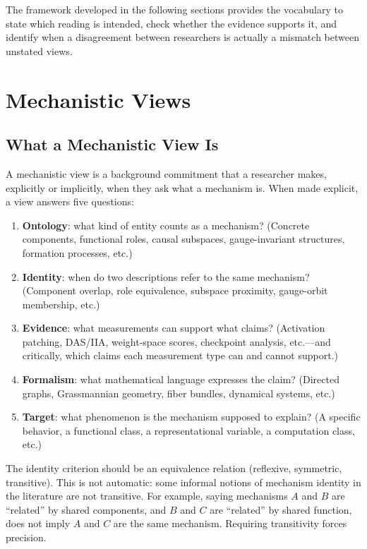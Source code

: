 \documentclass{article}
\begin{document}
The framework developed in the following sections provides the
vocabulary to state which reading is intended, check whether the
evidence supports it, and identify when a disagreement between
researchers is actually a mismatch between unstated views.


\section{Mechanistic Views}\label{sec:views}

\subsection{What a Mechanistic View Is}

A mechanistic view is a background commitment that a researcher makes,
explicitly or implicitly, when they ask what a mechanism is.  When made
explicit, a view answers five questions:

\begin{enumerate}[leftmargin=*, label=(\roman*)]
\item \textbf{Ontology}: what kind of entity counts as a mechanism?
      (Concrete components, functional roles, causal subspaces,
      gauge-invariant structures, formation processes, etc.)
\item \textbf{Identity}: when do two descriptions refer to the same
      mechanism?  (Component overlap, role equivalence, subspace
      proximity, gauge-orbit membership, etc.)
\item \textbf{Evidence}: what measurements can support what claims?
      (Activation patching, DAS/IIA, weight-space scores, checkpoint
      analysis, etc.---and critically, which claims each measurement
      type can and cannot support.)
\item \textbf{Formalism}: what mathematical language expresses the
      claim?  (Directed graphs, Grassmannian geometry, fiber bundles,
      dynamical systems, etc.)
\item \textbf{Target}: what phenomenon is the mechanism supposed to
      explain?  (A specific behavior, a functional class, a
      representational variable, a computation class, etc.)
\end{enumerate}

The identity criterion should be an equivalence relation (reflexive,
symmetric, transitive).  This is not automatic: some informal notions
of mechanism identity in the literature are not transitive.  For
example, saying mechanisms $A$ and $B$ are ``related'' by shared
components, and $B$ and $C$ are ``related'' by shared function, does
not imply $A$ and $C$ are the same mechanism.  Requiring transitivity
forces precision.
\end{document}
